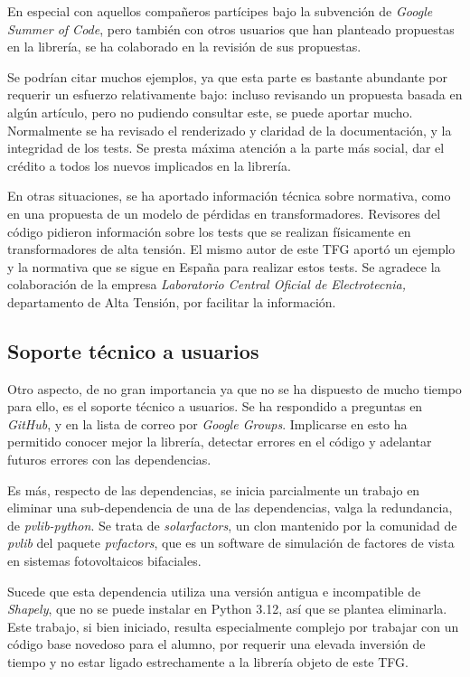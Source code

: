 En especial con aquellos compañeros partícipes bajo la subvención de \textit{Google Summer of Code}, pero también con otros usuarios que han planteado propuestas en la librería, se ha colaborado en la revisión de sus propuestas.

Se podrían citar muchos ejemplos, ya que esta parte es bastante abundante por requerir un esfuerzo relativamente bajo: incluso revisando un propuesta basada en algún artículo, pero no pudiendo consultar este, se puede aportar mucho. Normalmente se ha revisado el renderizado y claridad de la documentación, y la integridad de los tests. Se presta máxima atención a la parte más social, dar el crédito a todos los nuevos implicados en la librería.

En otras situaciones, se ha aportado información técnica sobre normativa, como en una propuesta de un modelo de pérdidas en transformadores. Revisores del código pidieron información sobre los tests que se realizan físicamente en transformadores de alta tensión. El mismo autor de este TFG aportó un ejemplo y la normativa que se sigue en España para realizar estos tests. Se agradece la colaboración de la empresa \textit{Laboratorio Central Oficial de Electrotecnia,} departamento de Alta Tensión, por facilitar la información.

\subsection{Soporte técnico a usuarios} \label{sct:desarrollo:soporte_tecnico}

Otro aspecto, de no gran importancia ya que no se ha dispuesto de mucho tiempo para ello, es el soporte técnico a usuarios. Se ha respondido a preguntas en \textit{GitHub}, y en la lista de correo por \textit{Google Groups}. Implicarse en esto ha permitido conocer mejor la librería, detectar errores en el código y adelantar futuros errores con las dependencias.

Es más, respecto de las dependencias, se inicia parcialmente un trabajo en eliminar una sub-dependencia de una de las dependencias, valga la redundancia, de \textit{pvlib-python}. Se trata de \textit{solarfactors}, un clon mantenido por la comunidad de \textit{pvlib} del paquete \textit{pvfactors}, que es un software de simulación de factores de vista en sistemas fotovoltaicos bifaciales.

Sucede que esta dependencia utiliza una versión antigua e incompatible de \textit{Shapely}, que no se puede instalar en Python 3.12, así que se plantea eliminarla. Este trabajo, si bien iniciado, resulta especialmente complejo por trabajar con un código base novedoso para el alumno, por requerir una elevada inversión de tiempo y no estar ligado estrechamente a la librería objeto de este TFG.

